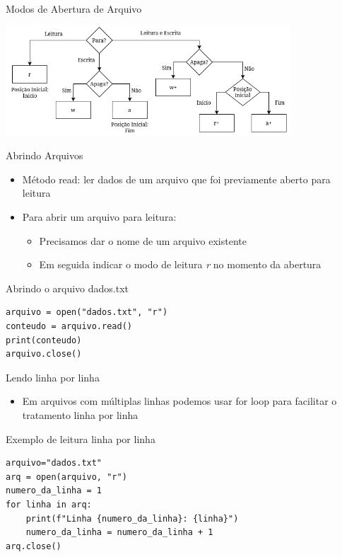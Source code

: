 \begin{frame}{Modos de Abertura de Arquivo}

\centering
\includegraphics[width=0.8\textwidth]{Images/diagrama-modos-leitura.png}


\end{frame}


\begin{frame}[fragile]{Abrindo Arquivos}
\begin{itemize}
    \item Método read: ler dados de um arquivo que foi previamente aberto para leitura
    \item Para abrir um arquivo para leitura: 
    \begin{itemize}
        \item Precisamos dar o nome de um arquivo existente 
        \item Em seguida indicar o modo de leitura \textit{r} no momento da abertura
    \end{itemize}

\end{itemize}

\begin{block}{Abrindo o arquivo dados.txt}
\begin{verbatim}
arquivo = open("dados.txt", "r")
conteudo = arquivo.read()
print(conteudo)
arquivo.close()
\end{verbatim}
\end{block}

\end{frame}



\begin{frame}[fragile]{Lendo linha por linha}

\begin{itemize}
    \item Em arquivos com múltiplas linhas podemos usar for loop para facilitar o tratamento linha por linha
\end{itemize}
    
\begin{exampleblock}{Exemplo de leitura linha por linha}
\begin{verbatim}
arquivo="dados.txt"
arq = open(arquivo, "r")
numero_da_linha = 1
for linha in arq:
    print(f"Linha {numero_da_linha}: {linha}")
    numero_da_linha = numero_da_linha + 1
arq.close()
\end{verbatim}
\end{exampleblock}


\end{frame}



